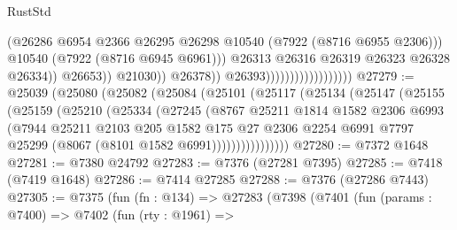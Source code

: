 \begin{lexlean}{RustStd}
\begin{coremodule}
                                                          (@26286
                                                            @6954
                                                            @2366
                                                            @26295
                                                            @26298
                                                            @10540
                                                            (@7922 (@8716 @6955 @2306)))
                                                          @10540
                                                          (@7922 (@8716 @6945 @6961)))
                                                        @26313
                                                        @26316
                                                        @26319
                                                        @26323
                                                        @26328
                                                        @26334))
                                                    @26653))
                                                @21030))
                                            @26378))
                                        @26393))))))))))))))))))
@27279 := @25039
    (@25080
      (@25082
        (@25084
          (@25101
            (@25117
              (@25134
                (@25147
                  (@25155
                    (@25159
                      (@25210
                        (@25334
                          (@27245
                            (@8767
                              @25211
                              @1814
                              @1582
                              @2306
                              @6993
                              (@7944
                                @25211
                                @2103
                                @205
                                @1582
                                @175
                                @27
                                @2306
                                @2254
                                @6991
                                @7797
                                @25299
                                (@8067 (@8101 @1582 @6991))))))))))))))))
@27280 := @7372 @1648
@27281 := @7380 @24792
@27283 := @7376 (@27281 @7395)
@27285 := @7418 (@7419 @1648)
@27286 := @7414 @27285
@27288 := @7376 (@27286 @7443)
@27305 := @7375
    (fun (fn : @134) =>
    @27283
      (@7398
        (@7401
          (fun (params : @7400) =>
          @7402
            (fun (rty : @1961) =>

\end{coremodule}
\end{lexlean}
